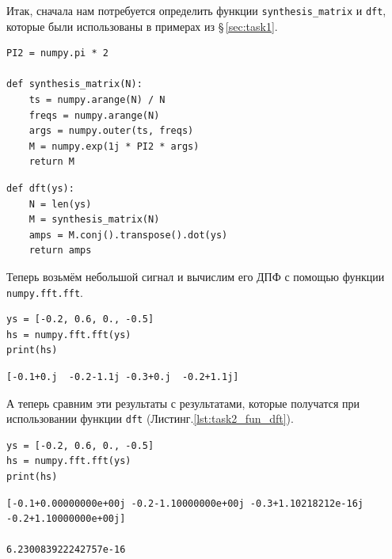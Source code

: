 \documentclass[a4paper, 14pt]{extarticle}
\begin{document}
    Итак, сначала нам потребуется определить функции \texttt{synthesis\_matrix} и \texttt{dft}, которые были использованы
    в примерах из \S\,\ref{sec:task1}.

    \begin{lstlisting}[caption= Функция \texttt{synthesis\_matrix}., label={lst:task2_fun_synthesis_matrix}]
PI2 = numpy.pi * 2

def synthesis_matrix(N):
    ts = numpy.arange(N) / N
    freqs = numpy.arange(N)
    args = numpy.outer(ts, freqs)
    M = numpy.exp(1j * PI2 * args)
    return M    \end{lstlisting}

    \begin{lstlisting}[caption= Функция \texttt{dft}., label={lst:task2_fun_dft}]
def dft(ys):
    N = len(ys)
    M = synthesis_matrix(N)
    amps = M.conj().transpose().dot(ys)
    return amps     \end{lstlisting}

    Теперь возьмём небольшой сигнал и вычислим его ДПФ с помощью функции \texttt{numpy.fft.fft}.

    \begin{lstlisting}[caption= Вычисление ДПФ с помощью \texttt{numpy.fft.fft}., label={lst:task2_dft_numpy}]
ys = [-0.2, 0.6, 0., -0.5]
hs = numpy.fft.fft(ys)
print(hs)   \end{lstlisting}

    \begin{lstlisting}[numbers=none, caption= Результаты для \texttt{numpy.fft.fft}., label={lst:task2_dft_numpy_res}]
[-0.1+0.j  -0.2-1.1j -0.3+0.j  -0.2+1.1j]   \end{lstlisting}

    А теперь сравним эти результаты с результатами, которые получатся при использовании функции \texttt{dft}
    (Листинг.\ref{lst:task2_fun_dft}).

    \begin{lstlisting}[caption= сравнение результатов функций \texttt{dft} и \texttt{numpy.fft.fft}., label={lst:task2_dft}]
ys = [-0.2, 0.6, 0., -0.5]
hs = numpy.fft.fft(ys)
print(hs)   \end{lstlisting}

    \begin{lstlisting}[numbers=none, caption= Результаты сравнения., label={lst:task2_dft_res}]
[-0.1+0.00000000e+00j -0.2-1.10000000e+00j -0.3+1.10218212e-16j -0.2+1.10000000e+00j]

6.230083922242757e-16   \end{lstlisting}
\end{document}
